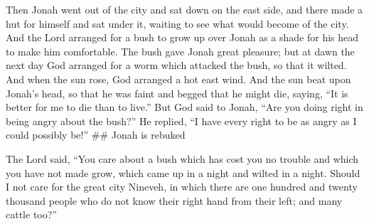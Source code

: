  Then Jonah went out of the city and sat down on the east
side, and there made a hut for himself and sat under it, waiting to see
what would become of the city.  And the Lord arranged for a
bush to grow up over Jonah as a shade for his head to make him
comfortable. The bush gave Jonah great pleasure;  but at
dawn the next day God arranged for a worm which attacked the bush, so
that it wilted.  And when the sun rose, God arranged a hot
east wind. And the sun beat upon Jonah's head, so that he was faint and
begged that he might die, saying, ``It is better for me to die than to
live.''  But God said to Jonah, ``Are you doing right in
being angry about the bush?'' He replied, ``I have every right to be as
angry as I could possibly be!'' \#\# Jonah is rebuked

 The Lord said, ``You care about a bush which has cost you
no trouble and which you have not made grow, which came up in a night
and wilted in a night.  Should I not care for the great
city Nineveh, in which there are one hundred and twenty thousand people
who do not know their right hand from their left; and many cattle too?''

